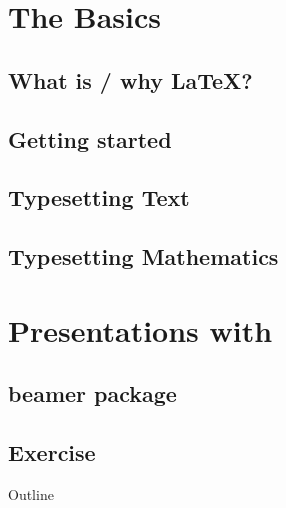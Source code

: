 \documentclass{beamer}
\begin{document}
\section{The Basics}
\subsection{What is / why \LaTeX{}?}
\subsection{Getting started}
\subsection{Typesetting Text}
\subsection{Typesetting Mathematics}

\section{Presentations with }
\subsection{beamer package}
\subsection{Exercise}

\begin{frame}{Outline}
\tableofcontents[currentsection]
\end{frame}
\end{document}
